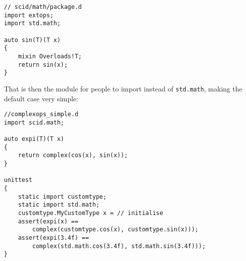 \documentclass[10pt,a5paper,DIV=13]{scrartcl}
\begin{document}
\begin{verbatim}
// scid/math/package.d
import extops;
import std.math;

auto sin(T)(T x)
{
    mixin Overloads!T;
    return sin(x);
}
\end{verbatim}

That is then the module for people to import instead of \texttt{std.math}, making the default case very simple:

\begin{verbatim}
//complexops_simple.d
import scid.math;

auto expi(T)(T x)
{
    return complex(cos(x), sin(x));
}

unittest
{
    static import customtype;
    static import std.math;
    customtype.MyCustomType x = // initialise
    assert(expi(x) ==
        complex(customtype.cos(x), customtype.sin(x)));
    assert(expi(3.4f) ==
        complex(std.math.cos(3.4f), std.math.sin(3.4f)));
}
\end{verbatim}
\end{document}
